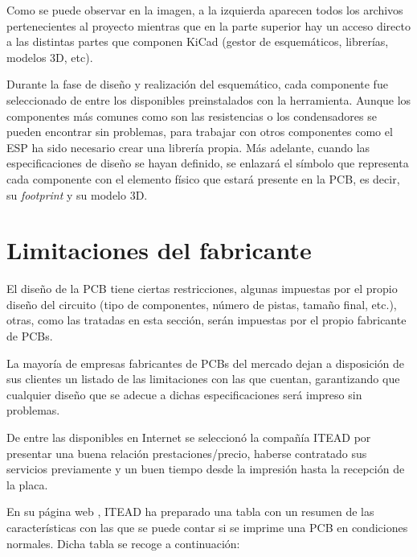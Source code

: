 Como se puede observar en la imagen, a la izquierda aparecen todos los archivos pertenecientes al proyecto mientras que en la parte superior hay un acceso directo a las distintas partes que componen KiCad (gestor de esquemáticos, librerías, modelos 3D, etc).

Durante la fase de diseño y realización del esquemático, cada componente fue seleccionado de entre los disponibles preinstalados con la herramienta. Aunque los componentes más comunes como son las resistencias o los condensadores se pueden encontrar sin problemas, para trabajar con otros componentes como el ESP ha sido necesario crear una librería propia. Más adelante, cuando las especificaciones de diseño se hayan definido, se enlazará el símbolo que representa cada componente con el elemento físico que estará presente en la \acrshort{PCB}, es decir, su \textit{footprint} y su modelo 3D.

\section{Limitaciones del fabricante\label{sec:ITEAD_PCB}}

El diseño de la \acrshort{PCB} tiene ciertas restricciones, algunas impuestas por el propio diseño del circuito (tipo de componentes, número de pistas, tamaño final, etc.), otras, como las tratadas en esta sección, serán impuestas por el propio fabricante de \acrshort{PCB}s.

La mayoría de empresas fabricantes de PCBs del mercado dejan a disposición de sus clientes un listado de las limitaciones con las que cuentan, garantizando que cualquier diseño que se adecue a dichas especificaciones será impreso sin problemas. 

De entre las disponibles en Internet se seleccionó la compañía ITEAD por presentar una buena relación prestaciones/precio, haberse contratado sus servicios previamente y un buen tiempo desde la impresión hasta la recepción de la placa.

En su página web \cite{ITEAD_PCB_Limitations}, ITEAD ha preparado una tabla con un resumen de las características con las que se puede contar si se imprime una \acrshort{PCB} en condiciones normales. Dicha tabla se recoge a continuación:

